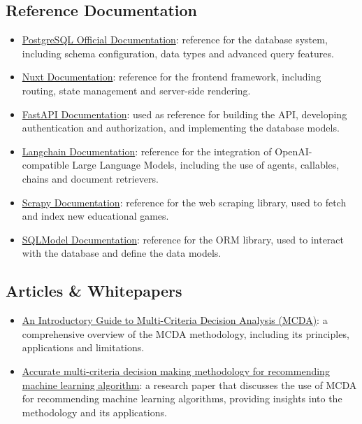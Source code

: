 \documentclass[11pt,italian,a4paper]{article}
\begin{document}
\subsection{Reference Documentation}
\begin{itemize}
    \item \href{https://www.postgresql.org/docs/current/}{PostgreSQL Official Documentation}: reference for the database system, including schema configuration, data types and advanced query features.
    \item \href{https://nuxt.com/docs/getting-started/introduction}{Nuxt Documentation}: reference for the frontend framework, including routing, state management and server-side rendering.
    \item \href{https://fastapi.tiangolo.com/tutorial/}{FastAPI Documentation}: used as reference for building the API, developing authentication and authorization, and implementing the database models.
    \item \href{https://langchain.com/docs/get_started/introduction.html}{Langchain Documentation}: reference for the integration of OpenAI-compatible Large Language Models, including the use of agents, callables, chains and document retrievers.
    \item \href{https://scrapy.org/doc/en/latest/}{Scrapy Documentation}: reference for the web scraping library, used to fetch and index new educational games.
    \item \href{https://sqlmodel.tiangolo.com/}{SQLModel Documentation}: reference for the ORM library, used to interact with the database and define the data models.
\end{itemize}

\subsection{Articles \& Whitepapers}
\begin{itemize}
    \item \href{https://analysisfunction.civilservice.gov.uk/policy-store/an-introductory-guide-to-mcda/}{An Introductory Guide to Multi-Criteria Decision Analysis (MCDA)}: a comprehensive overview of the MCDA methodology, including its principles, applications and limitations.
    \item \href{https://www.sciencedirect.com/science/article/pii/S0957417416306698}{Accurate multi-criteria decision making methodology for recommending machine learning algorithm}: a research paper that discusses the use of MCDA for recommending machine learning algorithms, providing insights into the methodology and its applications.
\end{itemize}
\end{document}

